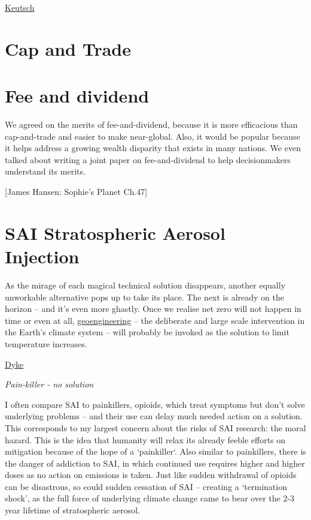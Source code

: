 \documentclass[
]{book}
\begin{document}
\href{https://www.c2g2.net/stratospheric-aerosol-injection-could-be-a-painkiller-but-not-a-cure-and-more-research-is-needed/}{Keutsch}

\hypertarget{cap-and-trade}{%
\chapter{Cap and Trade}\label{cap-and-trade}}

\hypertarget{fee-and-dividend}{%
\chapter{Fee and dividend}\label{fee-and-dividend}}

We agreed on the merits of fee-and-dividend, because it is
more efficacious than cap-and-trade and easier to make near-global. Also, it would be popular
because it helps address a growing wealth disparity that exists in many nations. We even talked
about writing a joint paper on fee-and-dividend to help decisionmakers understand its merits.

{[}James Hansen: Sophie's Planet Ch.47{]}

\hypertarget{sai-stratospheric-aerosol-injection-1}{%
\chapter{SAI Stratospheric Aerosol Injection}\label{sai-stratospheric-aerosol-injection-1}}

As the mirage of each magical technical solution disappears, another equally unworkable alternative pops up to take its place. The next is already on the horizon -- and it's even more ghastly. Once we realise net zero will not happen in time or even at all, \href{https://theconversation.com/why-you-need-to-get-involved-in-the-geoengineering-debate-now-85619}{geoengineering} -- the deliberate and large scale intervention in the Earth's climate system -- will probably be invoked as the solution to limit temperature increases.

\href{https://theconversation.com/climate-scientists-concept-of-net-zero-is-a-dangerous-trap-157368}{Dyke}

\emph{Pain-killer - no solution}

I often compare SAI to painkillers, opioids, which treat symptoms but don't solve underlying problems -- and their use can delay much needed action on a solution.
This corresponds to my largest concern about the risks of SAI research: the moral hazard. This is the idea that humanity will relax its already feeble efforts on mitigation because of the hope of a `painkiller`.
Also similar to painkillers, there is the danger of addiction to SAI, in which continued use requires higher and higher doses as no action on emissions is taken. Just like sudden withdrawal of opioids can be disastrous, so could sudden cessation of SAI -- creating a `termination shock', as the full force of underlying climate change came to bear over the 2-3 year lifetime of stratospheric aerosol.
\end{document}
